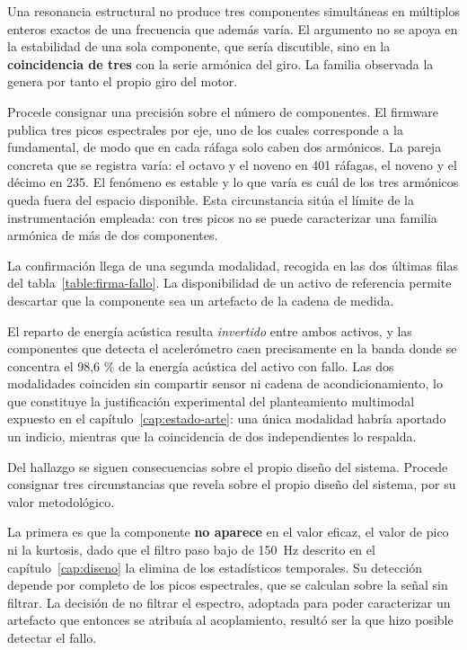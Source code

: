 Una resonancia estructural no produce tres componentes simultáneas en múltiplos enteros
exactos de una frecuencia que además varía. El argumento no se apoya en la estabilidad de una
sola componente, que sería discutible, sino en la \textbf{coincidencia de tres} con la serie
armónica del giro. La familia observada la genera por tanto el propio giro del motor.

Procede consignar una precisión sobre el número de componentes. El firmware publica tres picos
espectrales por eje, uno de los cuales corresponde a la fundamental, de modo que en cada
ráfaga solo caben dos armónicos. La pareja concreta que se registra varía: el octavo y el
noveno en 401 ráfagas, el noveno y el décimo en 235. El fenómeno es estable y lo que varía es
cuál de los tres armónicos queda fuera del espacio disponible. Esta circunstancia sitúa el
límite de la instrumentación empleada: con tres picos no se puede caracterizar una familia
armónica de más de dos componentes.

La confirmación llega de una segunda modalidad, recogida en las dos últimas filas del
tabla~\ref{table:firma-fallo}. La disponibilidad de un activo de referencia permite descartar que
la componente sea un artefacto de la cadena de medida.

El reparto de energía acústica resulta \textit{invertido} entre ambos activos, y las
componentes que detecta el acelerómetro caen precisamente en la banda donde se concentra el
98,6 \% de la energía acústica del activo con fallo. Las dos modalidades coinciden sin compartir sensor ni
cadena de acondicionamiento, lo que constituye la justificación experimental del planteamiento
multimodal expuesto en el capítulo~\ref{cap:estado-arte}: una única modalidad habría aportado
un indicio, mientras que la coincidencia de dos independientes lo respalda.

Del hallazgo se siguen consecuencias sobre el propio diseño del sistema. Procede consignar tres circunstancias que revela sobre el propio diseño del
sistema, por su valor metodológico.

La primera es que la componente \textbf{no aparece} en el valor eficaz, el valor de pico ni la
kurtosis, dado que el filtro paso bajo de \mbox{150 Hz} descrito en el
capítulo~\ref{cap:diseno} la elimina de los estadísticos temporales. Su detección depende por
completo de los picos espectrales, que se calculan sobre la señal sin filtrar. La decisión de
no filtrar el espectro, adoptada para poder caracterizar un artefacto que entonces se
atribuía al acoplamiento, resultó ser la que hizo posible detectar el fallo.

